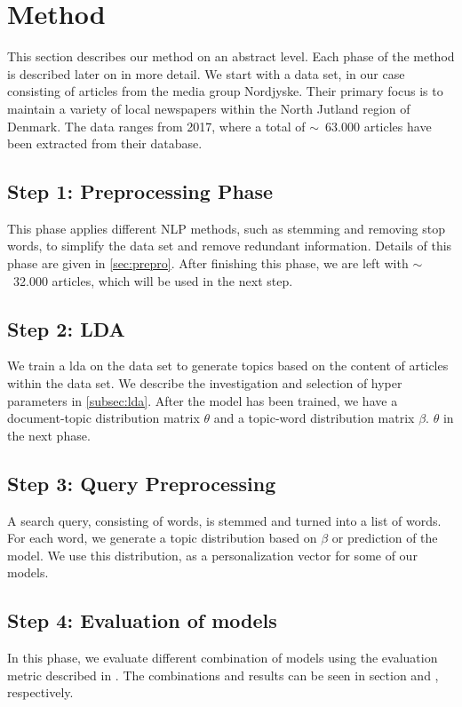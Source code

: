 \section{Method}\label{sec:method}
This section describes our method on an abstract level.
Each phase of the method is described later on in more detail. 
We start with a data set, in our case consisting of articles from the media group Nordjyske. 
Their primary focus is to maintain a variety of local newspapers within the North Jutland region of Denmark. 
The data ranges from 2017, where a total of $\sim$~63.000 articles have been extracted from their database.

\subsection*{Step 1: Preprocessing Phase}
This phase applies different \gls{NLP} methods, such as stemming and removing stop words, to simplify the data set and remove redundant information.
Details of this phase are given in \autoref{sec:prepro}.
After finishing this phase, we are left with $\sim$~32.000 articles, which will be used in the next step.

\subsection*{Step 2: LDA}
We train a \acrfull{lda} on the data set to generate topics based on the content of articles within the data set. 
We describe the investigation and selection of hyper parameters in \autoref{subsec:lda}. 
After the model has been trained, we have a document-topic distribution matrix $\theta$ and a topic-word distribution matrix $\beta$.
$\theta$ in the next phase.

\subsection*{Step 3: Query Preprocessing}
A search query, consisting of words, is stemmed and turned into a list of words.
For each word, we generate a topic distribution based on $\beta$ or prediction of the model.
We use this distribution, as a personalization vector for some of our models.


\subsection*{Step 4: Evaluation of models}
In this phase, we evaluate different combination of models using the evaluation metric described in . 
The combinations and results can be seen in section  and , respectively.

%
